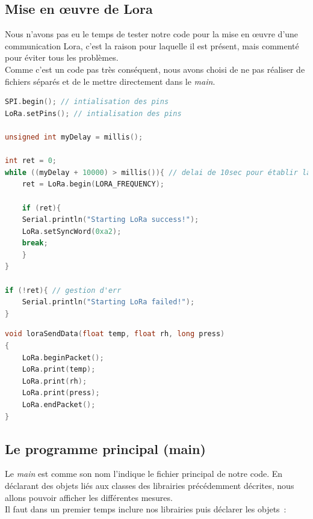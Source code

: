         \subsection{Mise en œuvre de Lora}
            Nous n'avons pas eu le temps de tester notre code pour la mise en œuvre d'une communication Lora, c'est la raison pour laquelle il est présent, mais commenté pour éviter tous les problèmes. \\
            Comme c'est un code pas très conséquent, nous avons choisi de ne pas réaliser de fichiers séparés et de le mettre directement dans le \textit{main}. \\


\begin{lstlisting}[style=myC, caption=Initialisation de Lora pour la carte capteur, language=C, frame=lines]
SPI.begin(); // intialisation des pins
LoRa.setPins(); // intialisation des pins

unsigned int myDelay = millis();

int ret = 0;
while ((myDelay + 10000) > millis()){ // delai de 10sec pour établir la communication Lora
    ret = LoRa.begin(LORA_FREQUENCY);

    if (ret){
    Serial.println("Starting LoRa success!");
    LoRa.setSyncWord(0xa2);
    break;
    }
}

if (!ret){ // gestion d'err
    Serial.println("Starting LoRa failed!");
}
\end{lstlisting}

\begin{lstlisting}[style=myC, caption=Emission de données, language=C, frame=lines]
void loraSendData(float temp, float rh, long press)
{
    LoRa.beginPacket();
    LoRa.print(temp);
    LoRa.print(rh);
    LoRa.print(press);
    LoRa.endPacket();
}
\end{lstlisting}



        \subsection{Le programme principal (main)}
            Le \textit{main} est comme son nom l'indique le fichier principal de notre code. En déclarant des objets liés aux classes des librairies précédemment décrites, nous allons pouvoir afficher les différentes mesures. \\

            \noindent
            Il faut dans un premier temps inclure nos librairies puis déclarer les objets~:

